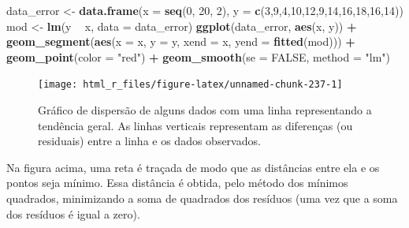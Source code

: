 \documentclass[
]{book}
\newenvironment{Shaded}{\begin{snugshade}}{\end{snugshade}}
\newcommand{\DataTypeTok}[1]{\textcolor[rgb]{0.13,0.29,0.53}{#1}}
\newcommand{\DecValTok}[1]{\textcolor[rgb]{0.00,0.00,0.81}{#1}}
\newcommand{\KeywordTok}[1]{\textcolor[rgb]{0.13,0.29,0.53}{\textbf{#1}}}
\newcommand{\NormalTok}[1]{#1}
\newcommand{\OperatorTok}[1]{\textcolor[rgb]{0.81,0.36,0.00}{\textbf{#1}}}
\newcommand{\OtherTok}[1]{\textcolor[rgb]{0.56,0.35,0.01}{#1}}
\newcommand{\StringTok}[1]{\textcolor[rgb]{0.31,0.60,0.02}{#1}}
\begin{document}
 

\begin{Shaded}
\begin{Highlighting}[]
\NormalTok{data_error <-}\StringTok{ }\KeywordTok{data.frame}\NormalTok{(}\DataTypeTok{x =} \KeywordTok{seq}\NormalTok{(}\DecValTok{0}\NormalTok{, }\DecValTok{20}\NormalTok{, }\DecValTok{2}\NormalTok{),}
                         \DataTypeTok{y =} \KeywordTok{c}\NormalTok{(}\DecValTok{3}\NormalTok{,}\DecValTok{9}\NormalTok{,}\DecValTok{4}\NormalTok{,}\DecValTok{10}\NormalTok{,}\DecValTok{12}\NormalTok{,}\DecValTok{9}\NormalTok{,}\DecValTok{14}\NormalTok{,}\DecValTok{16}\NormalTok{,}\DecValTok{18}\NormalTok{,}\DecValTok{16}\NormalTok{,}\DecValTok{14}\NormalTok{))}
\NormalTok{mod <-}\StringTok{ }\KeywordTok{lm}\NormalTok{(y }\OperatorTok{~}\StringTok{ }\NormalTok{x, }\DataTypeTok{data =}\NormalTok{ data_error)}
\KeywordTok{ggplot}\NormalTok{(data_error, }\KeywordTok{aes}\NormalTok{(x, y)) }\OperatorTok{+}\StringTok{ }
\StringTok{       }\KeywordTok{geom_segment}\NormalTok{(}\KeywordTok{aes}\NormalTok{(}\DataTypeTok{x =}\NormalTok{ x, }\DataTypeTok{y =}\NormalTok{ y, }\DataTypeTok{xend =}\NormalTok{ x, }\DataTypeTok{yend =} \KeywordTok{fitted}\NormalTok{(mod))) }\OperatorTok{+}
\StringTok{       }\KeywordTok{geom_point}\NormalTok{(}\DataTypeTok{color =} \StringTok{"red"}\NormalTok{) }\OperatorTok{+}\StringTok{ }
\StringTok{       }\KeywordTok{geom_smooth}\NormalTok{(}\DataTypeTok{se =} \OtherTok{FALSE}\NormalTok{, }\DataTypeTok{method =} \StringTok{"lm"}\NormalTok{)}
\end{Highlighting}
\end{Shaded}

\begin{figure}

{\centering \texttt{[image: html\_r\_files/figure-latex/unnamed-chunk-237-1]} 

}

\caption{Gráfico de dispersão de alguns dados com uma linha representando a tendência geral. As linhas verticais representam as diferenças (ou residuais) entre a linha e os dados observados.}\label{fig:unnamed-chunk-237}
\end{figure}

Na figura acima, uma reta é traçada de modo que as distâncias entre ela e os pontos seja mínimo. Essa distância é obtida, pelo método dos mínimos quadrados, minimizando a soma de quadrados dos resíduos  (uma vez que a soma dos resíduos é igual a zero).
\end{document}
